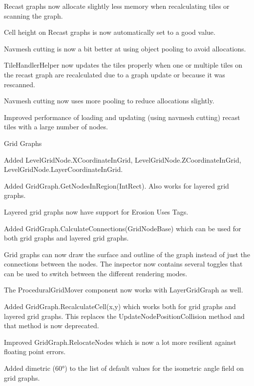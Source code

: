 \begin{DoxyItemize}
\begin{DoxyItemize}
\begin{DoxyItemize}
\begin{DoxyItemize}
\item Recast graphs now allocate slightly less memory when recalculating tiles or scanning the graph.
\item Cell height on Recast graphs is now automatically set to a good value.
\item Navmesh cutting is now a bit better at using object pooling to avoid allocations.
\item Tile\+Handler\+Helper now updates the tiles properly when one or multiple tiles on the recast graph are recalculated due to a graph update or because it was rescanned.
\item Navmesh cutting now uses more pooling to reduce allocations slightly.
\item Improved performance of loading and updating (using navmesh cutting) recast tiles with a large number of nodes.
\end{DoxyItemize}
\item Grid Graphs
\begin{DoxyItemize}
\item Added Level\+Grid\+Node.\+X\+Coordinate\+In\+Grid, Level\+Grid\+Node.\+Z\+Coordinate\+In\+Grid, Level\+Grid\+Node.\+Layer\+Coordinate\+In\+Grid.
\item Added Grid\+Graph.\+Get\+Nodes\+In\+Region(\+Int\+Rect). Also works for layered grid graphs.
\item Layered grid graphs now have support for \textquotesingle{}Erosion Uses Tags\textquotesingle{}.
\item Added Grid\+Graph.\+Calculate\+Connections(\+Grid\+Node\+Base) which can be used for both grid graphs and layered grid graphs.
\item Grid graphs can now draw the surface and outline of the graph instead of just the connections between the nodes. The inspector now contains several toggles that can be used to switch between the different rendering modes.
\item The Procedural\+Grid\+Mover component now works with Layer\+Grid\+Graph as well.
\item Added Grid\+Graph.\+Recalculate\+Cell(x,y) which works both for grid graphs and layered grid graphs. This replaces the Update\+Node\+Position\+Collision method and that method is now deprecated.
\item Improved Grid\+Graph.\+Relocate\+Nodes which is now a lot more resilient against floating point errors.
\item Added dimetric (60°) to the list of default values for the isometric angle field on grid graphs.

\end{DoxyItemize}
\end{DoxyItemize}
\end{DoxyItemize}
\end{DoxyItemize}
